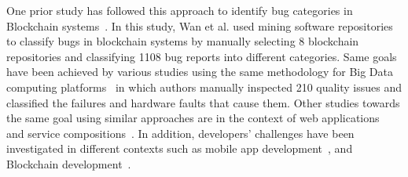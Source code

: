  One prior study has followed this approach to identify bug categories in Blockchain systems~\cite{blockChainBugs}. In this study, Wan et al. used mining software repositories to classify bugs in blockchain systems \cite{blockChainBugs} by manually selecting 8 blockchain repositories and classifying 1108 bug reports into different categories. Same goals have been achieved by various studies using the same methodology for Big Data computing platforms~\cite{bigDataIssues} in which authors manually inspected 210 quality issues and classified the failures and hardware faults that cause them. Other studies towards the same goal using similar approaches are in the context of web applications~\cite{jsBugsOcariza} and service compositions~\cite{chan2007fault}. 
In addition, developers' challenges have been investigated in different contexts such as mobile app development~\cite{joorabchi2013real}, and Blockchain development~\cite{zou2019smart}. 


\endinput

